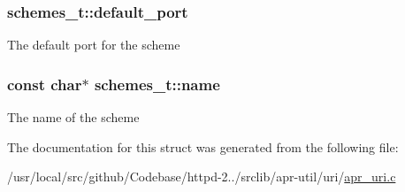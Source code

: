 \subsubsection[{\texorpdfstring{default\+\_\+port}{default_port}}]{ schemes\+\_\+t\+::default\+\_\+port}\hypertarget{structschemes__t_a8a38fa1c9e9571304168a3399870e36e}{}\label{structschemes__t_a8a38fa1c9e9571304168a3399870e36e}
The default port for the scheme 
\subsubsection[{\texorpdfstring{name}{name}}]{\setlength{\rightskip}{0pt plus 5cm}const char$\ast$ schemes\+\_\+t\+::name}\hypertarget{structschemes__t_ac8dbfa800d2f925cf1a8641f0a279e31}{}\label{structschemes__t_ac8dbfa800d2f925cf1a8641f0a279e31}
The name of the scheme 

The documentation for this struct was generated from the following file\+:\begin{DoxyCompactItemize}
\item 
/usr/local/src/github/\+Codebase/httpd-\/2../srclib/apr-\/util/uri/\hyperlink{apr__uri_8c}{apr\+\_\+uri.\+c}\end{DoxyCompactItemize}
